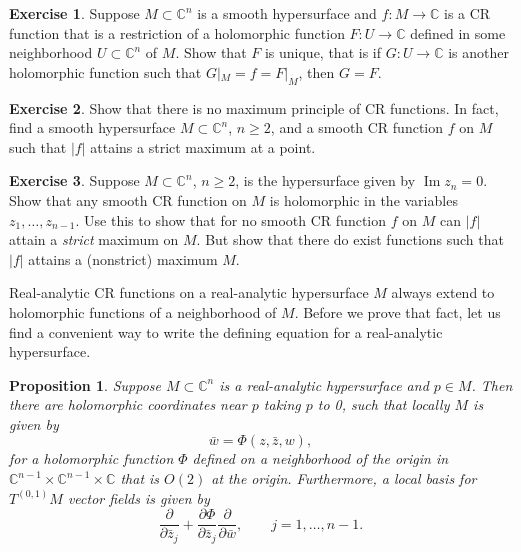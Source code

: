 \documentclass[12pt,openany]{book}
\renewcommand{\Im}{\operatorname{Im}}
\newcommand{\sabs}[1]{\lvert {#1} \rvert}
\newcommand{\C}{{\mathbb{C}}}
\theoremstyle{plain}
\newtheorem{prop}[thm]{Proposition}
\theoremstyle{remark}
\theoremstyle{definition}
\newenvironment{exbox}{%
    \def\FrameCommand{\vrule width 1pt \relax\hspace {10pt}}%
    \MakeFramed {\advance \hsize -\width \FrameRestore }%
}{%
    \endMakeFramed
}
\theoremstyle{exercise}
\newtheorem{exercise}{Exercise}[section]
\theoremstyle{example}
\begin{document}
\begin{exbox}
\begin{exercise}
Suppose $M \subset \C^n$ is a smooth hypersurface
and $f \colon M \to \C$ is a CR function that is a restriction
of a holomorphic function $F \colon U \to \C$ defined in
some neighborhood $U \subset \C^n$ of $M$.  Show that $F$ is unique,
that is if $G \colon U \to \C$ is another holomorphic function such that
$G|_M = f = F|_M$, then $G=F$.
\end{exercise}

\begin{exercise}
Show that there is no maximum principle of CR functions.  In fact, find a
smooth hypersurface $M \subset \C^n$, $n \geq 2$, and a smooth CR function
$f$ on $M$ such that $\sabs{f}$ attains a strict maximum at a point.
\end{exercise}

\begin{exercise}
Suppose $M \subset \C^n$, $n \geq 2$, is the hypersurface given by $\Im z_n
= 0$.  Show that any smooth CR function on $M$ is holomorphic in the variables
$z_1,\ldots,z_{n-1}$.  Use this to show that for no smooth CR function $f$ on $M$ can
$\sabs{f}$ attain a \emph{strict} maximum on $M$.  But show that there do
exist functions such that $\sabs{f}$ attains a (nonstrict) maximum $M$.
\end{exercise}
\end{exbox}

Real-analytic CR functions on a real-analytic
hypersurface $M$ always extend to holomorphic functions of a neighborhood of $M$.
Before we prove that fact, let us find a convenient way to write the defining
equation for a real-analytic hypersurface.

\begin{prop}
Suppose $M \subset \C^n$ is a real-analytic hypersurface and $p \in M$.
Then there are holomorphic coordinates near $p$ taking $p$ to 0,
such that locally $M$ is given by
\begin{equation*}
\bar{w} = \Phi(z,\bar{z},w) ,
\end{equation*}
for a holomorphic function $\Phi$ defined on a neighborhood of the origin
in $\C^{n-1} \times \C^{n-1} \times \C$ that is $O(2)$ at the origin.
Furthermore, a local basis for $T^{(0,1)} M$ vector fields is given by
\begin{equation*}
\frac{\partial}{\partial \bar{z}_j}
+\frac{\partial \Phi}{\partial \bar{z}_j} \frac{\partial}{\partial \bar{w}} ,
\qquad j=1,\ldots,n-1.
\end{equation*}
\end{prop}
\end{document}
